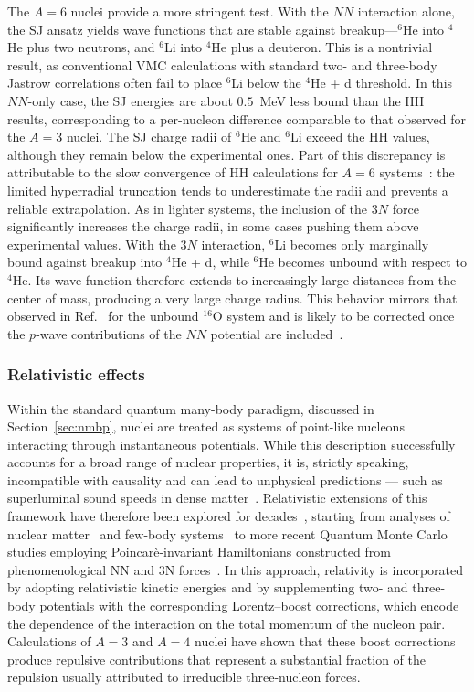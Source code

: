 The $A=6$ nuclei provide a more stringent test. With the $NN$ interaction alone, the SJ ansatz yields wave functions that are stable against breakup—$^6$He into $^4$He plus two neutrons, and $^6$Li into $^4$He plus a deuteron. This is a nontrivial result, as conventional VMC calculations with standard two- and three-body Jastrow correlations often fail to place $^6$Li below the $^4$He + d threshold. In this $NN$-only case, the SJ energies are about $0.5$~MeV less bound than the HH results, corresponding to a per-nucleon difference comparable to that observed for the $A=3$ nuclei.
The SJ charge radii of $^6$He and $^6$Li exceed the HH values, although they remain below the experimental ones. Part of this discrepancy is attributable to the slow convergence of HH calculations for $A=6$ systems~\cite{gnech_calculation_2020}: the limited hyperradial truncation tends to underestimate the radii and prevents a reliable extrapolation. As in lighter systems, the inclusion of the $3N$ force significantly increases the charge radii, in some cases pushing them above experimental values. With the $3N$ interaction, $^6$Li becomes only marginally bound against breakup into $^4$He + d, while $^6$He becomes unbound with respect to $^4$He. Its wave function therefore extends to increasingly large distances from the center of mass, producing a very large charge radius. This behavior mirrors that observed in Ref.~\cite{contessi_ground-state_2017} for the unbound $^{16}$O system and is likely to be corrected once the $p$-wave contributions of the $NN$ potential are included~\cite{gattobigio_embedding_2019}.


\subsubsection[Relativistic effects]{Relativistic effects}
Within the standard quantum many-body paradigm, discussed in Section~\ref{sec:nmbp}, nuclei are treated as systems of point-like nucleons interacting through instantaneous potentials. While this description successfully accounts for a broad range of nuclear properties, it is, strictly speaking, incompatible with causality and can lead to unphysical predictions --- such as superluminal sound speeds in dense matter~\cite{Akmal:1998cf,sabatucci_relativistic_2024}. Relativistic extensions of this framework have therefore been explored for decades~\cite{coester_relativistic_1975}, starting from analyses of nuclear matter~\cite{brockmann_relativistic_1990} and few-body systems~\cite{glockle_relativistic_1986} to more recent Quantum Monte Carlo studies employing Poincar\`e-invariant Hamiltonians constructed from phenomenological NN and 3N forces~\cite{forest_quantum_1999}. In this approach, relativity is incorporated by adopting relativistic kinetic energies and by supplementing two- and three-body potentials with the corresponding Lorentz–boost corrections, which encode the dependence of the interaction on the total momentum of the nucleon pair. Calculations of $A=3$ and $A=4$ nuclei have shown that these boost corrections produce repulsive contributions that represent a substantial fraction of the repulsion usually attributed to irreducible three-nucleon forces. 

